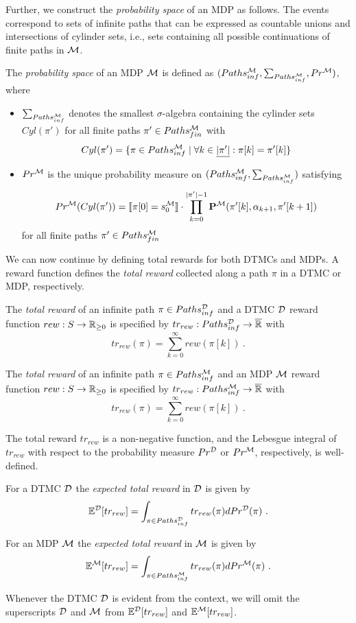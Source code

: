 Further, we construct the \textit{probability space} of an MDP as follows. The events correspond to sets of infinite paths that can be expressed as countable unions and intersections of cylinder sets, i.e., sets containing all possible continuations of finite paths in $\mathcal{M}$.

\begin{definition}\label{def:prob_space_of_MDP}
    The \textit{probability space} of an MDP $\mathcal{M}$ is defined as $(Paths_{inf}^{\mathcal{M}}, \sum_{Paths_{inf}^{\mathcal{M}}}, Pr^{\mathcal{M}})$, where
    \begin{itemize}
        \item $\sum_{Paths_{inf}^{\mathcal{M}}}$ denotes the smallest $\sigma$-algebra containing the cylinder sets $Cyl(\pi')$ for all finite paths $\pi'\in Paths_{fin}^{\mathcal{M}}$ with
        \[Cyl(\pi') = \{\pi \in Paths_{inf}^{\mathcal{M}}\mid\forall k\in \underline{|\pi'|}: \pi[k] = \pi'[k]\}\]
        \item $Pr^{\mathcal{M}}$ is the unique probability measure on $(Paths_{inf}^{\mathcal{M}}, \sum_{Paths_{inf}^{\mathcal{M}}})$ satisfying
        \[Pr^{\mathcal{M}}(Cyl(\pi')) = \llbracket \pi[0] = s_0^{\mathcal{M}}\rrbracket \cdot \prod_{k=0}^{|\pi'|-1}\mathbf{P}^{\mathcal{M}}(\pi'[k],\alpha_{k+1},\pi'[k+1])\]
        for all finite paths $\pi'\in Paths_{fin}^{\mathcal{M}}$
    \end{itemize}
\end{definition}

We can now continue by defining total rewards for both DTMCs and MDPs.
A reward function defines the \textit{total reward} collected along a path $\pi$ in a DTMC or MDP, respectively.

\begin{definition}
    The \textit{total reward} of an infinite path $\pi \in Paths^{\mathcal{D}}_{inf}$ and a DTMC $\mathcal{D}$ reward function $rew: S\rightarrow\mathbb{R}_{\geq 0}$ is specified by $tr_{rew}: Paths^{\mathcal{D}}_{inf} \rightarrow\overline{\mathbb{R}}$ with
    \[tr_{rew}(\pi) = \sum_{k=0}^\infty rew(\pi[k])\ .\]

    The \textit{total reward} of an infinite path $\pi \in Paths_{inf}^{\mathcal{M}}$ and an MDP $\mathcal{M}$ reward function $rew: S\rightarrow\mathbb{R}_{\geq 0}$ is specified by $tr_{rew}: Paths_{inf}^{\mathcal{M}} \rightarrow\overline{\mathbb{R}}$ with
    \[tr_{rew}(\pi) = \sum_{k=0}^\infty rew(\pi[k])\ .\]
\end{definition}
The total reward $tr_{rew}$ is a non-negative function, and the Lebesgue integral of $tr_{rew}$ with respect to the probability measure $Pr^{\mathcal{D}}$ or $Pr^{\mathcal{M}}$, respectively, is well-defined.

\begin{definition}
    For a DTMC $\mathcal{D}$ the \textit{expected total reward} in $\mathcal{D}$ is given by
    \[\mathbb{E}^{\mathcal{D}}[tr_{rew}] = \int_{\pi\in Paths^{\mathcal{D}}_{inf}}tr_{rew}(\pi)dPr^{\mathcal{D}}(\pi)\ .\]

    For an MDP $\mathcal{M}$ the \textit{expected total reward} in $\mathcal{M}$ is given by
    \[\mathbb{E}^{\mathcal{M}}[tr_{rew}] = \int_{\pi\in Paths_{inf}^{\mathcal{M}}}tr_{rew}(\pi)dPr^{\mathcal{M}}(\pi)\ .\]
\end{definition}
Whenever the DTMC $\mathcal{D}$ is evident from the context, we will omit the superscripts $\mathcal{D}$ and $\mathcal{M}$ from $\mathbb{E}^{\mathcal{D}}[tr_{rew}]$ and $\mathbb{E}^{\mathcal{M}}[tr_{rew}]$.


